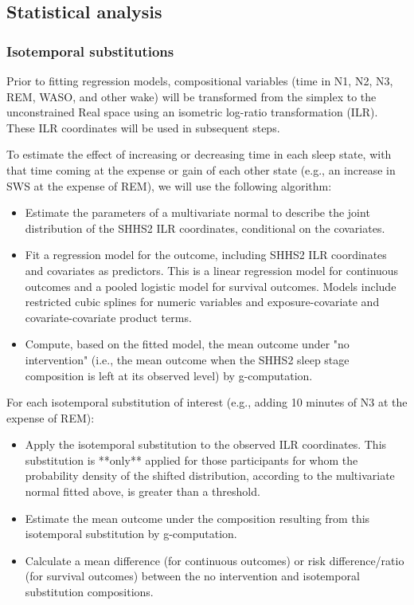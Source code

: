 \documentclass{article}
\begin{document}
\subsection{Statistical analysis}

\subsubsection{Isotemporal substitutions}

Prior to fitting regression models, compositional variables (time in N1, N2, N3, REM, WASO, and other wake) will be transformed from the simplex to the unconstrained Real space using an isometric log-ratio transformation (ILR). These ILR coordinates will be used in subsequent steps.

To estimate the effect of increasing or decreasing time in each sleep state, with that time coming at the expense or gain of each other state (e.g., an increase in SWS at the expense of REM), we will use the following algorithm:

\begin{itemize}
    \item Estimate the parameters of a multivariate normal to describe the joint distribution of the SHHS2 ILR coordinates, conditional on the covariates.
    \item Fit a regression model for the outcome, including SHHS2 ILR coordinates and covariates as predictors. This is a linear regression model for continuous outcomes and a pooled logistic model for survival outcomes. Models include restricted cubic splines for numeric variables and exposure-covariate and covariate-covariate product terms.
    \item Compute, based on the fitted model, the mean outcome under "no intervention" (i.e., the mean outcome when the SHHS2 sleep stage composition is left at its observed level) by g-computation.
\end{itemize}

For each isotemporal substitution of interest (e.g., adding 10 minutes of N3 at the expense of REM):

\begin{itemize}
    \item Apply the isotemporal substitution to the observed ILR coordinates. This substitution is **only** applied for those participants for whom the probability density of the shifted distribution, according to the multivariate normal fitted above, is greater than a threshold.
    \item Estimate the mean outcome under the composition resulting from this isotemporal substitution by g-computation.
    \item Calculate a mean difference (for continuous outcomes) or risk difference/ratio (for survival outcomes) between the no intervention and isotemporal substitution compositions.
\end{itemize}
\end{document}
